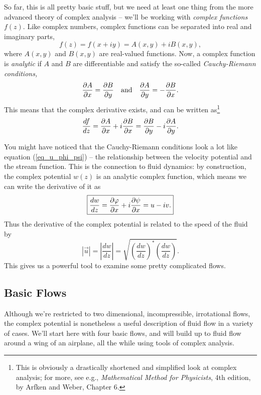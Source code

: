 So far, this is all pretty basic stuff, but we need at least one thing from the more advanced theory of complex analysis -- we'll be working with \emph{complex functions} $f(z)$.  Like complex numbers, complex functions can be separated into real and imaginary parts,
\[
f(z) = f(x + iy) = A(x, y) + i B(x, y),
\]
where $A(x, y)$ and $B(x, y)$ are real-valued functions.  Now, a complex function is \emph{analytic} if $A$ and $B$ are differentiable and satisfy the so-called \emph{Cauchy-Riemann conditions,}
\begin{equation}
\label{eq_cauchy_riemann}
\frac{\partial {A}}{\partial {x}} = \frac{\partial {B}}{\partial {y}} \quad \text{and} \quad \frac{\partial {A}}{\partial {y}} = - \frac{\partial {B}}{\partial {x}}.
\end{equation}
This means that the complex derivative exists, and can be written as\footnote{This is obviously a drastically shortened and simplified look at complex analysis; for more, see e.g., \emph{Mathematical Method for Physicists}, 4th edition, by Arfken and Weber, Chapter 6.}
\begin{equation}
\frac{df}{dz} = \frac{\partial {A}}{\partial {x}} + i \frac{\partial {B}}{\partial {x}} = \frac{\partial {B}}{\partial {y}} - i \frac{\partial {A}}{\partial {y}}.
\end{equation}

You might have noticed that the Cauchy-Riemann conditions look a lot like equation (\ref{eq_u_phi_psi}) -- the relationship between the velocity potential and the stream function.  This is the connection to fluid dynamics:  by construction, the complex potential $w(z)$ is an analytic complex function, which means we can write the derivative of it as
\begin{equation}
\label{eq_w_deriv}
\boxed{
\frac{dw}{dz} = \frac{\partial {\varphi}}{\partial {x}} + i \frac{\partial {\psi}}{\partial {x}} = u - iv.
}
\end{equation}
Thus the derivative of the complex potential is related to the speed of the fluid by
\[
|\vec{u} | = \left| \frac{dw}{dz} \right| = \sqrt{ \left( \frac{dw}{dz} \right)^* \left( \frac{dw}{dz} \right) }.
\]
This gives us a powerful tool to examine some pretty complicated flows.



\subsection{Basic Flows}

Although we're restricted to two dimensional, incompressible, irrotational flows, the complex potential is nonetheless a useful description of fluid flow in a variety of cases.  We'll start here with four basic flows, and will build up to fluid flow around a wing of an airplane, all the while using tools of complex analysis.

